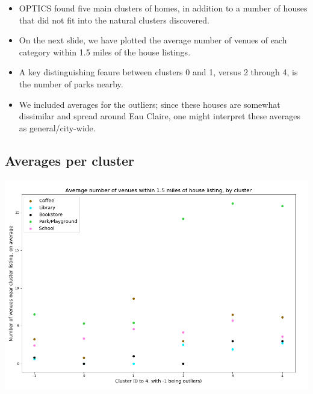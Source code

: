 \documentclass{beamer}
\begin{document}
\begin{frame}
    \begin{itemize}
        \item OPTICS found five main clusters of homes, in addition to a number of houses that did not fit into the natural clusters discovered. \pause

        \item On the next slide, we have plotted the average number of venues of each category within 1.5 miles of the house listings. \pause
            
        \item A key distinguishing feaure between clusters 0 and 1, versus 2 through 4, is the number of parks nearby. \pause

        \item We included averages for the outliers; since these houses are somewhat dissimilar and spread around Eau Claire, one might interpret these averages as general/city-wide. 
    \end{itemize}
\end{frame}

\subsection{Averages per cluster}
\begin{frame}
    \hspace{-0.6cm}
    \begin{minipage}{\textwidth}
    \includegraphics[scale=0.35]{Avg_venues.png}
    \end{minipage}\hspace{5cm}
\end{frame}
\end{document}
